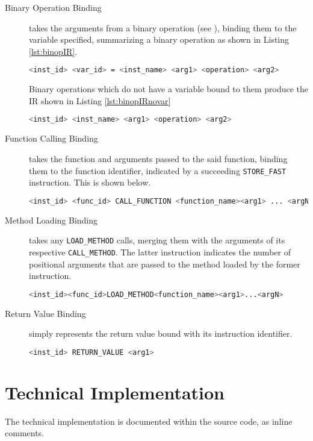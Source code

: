         \begin{description}
            \item[Binary Operation Binding] takes the arguments from a binary operation (see ), binding them to the variable specified, summarizing a binary operation as shown in Listing \ref{lst:binopIR}.
            
            \begin{lstlisting}[language=bash,caption=Binary Operation Binding Syntax w/variable,numbers=none,label=lst:binopIR]
<inst_id> <var_id> = <inst_name> <arg1> <operation> <arg2>
            \end{lstlisting}

            Binary operations which do not have a variable bound to them produce the \acs{IR} shown in Listing \ref{lst:binopIRnovar}

            \begin{lstlisting}[language=bash,caption=Binary Operation Binding Syntax w/no variable,numbers=none,label=lst:binopIRnovar]
<inst_id> <inst_name> <arg1> <operation> <arg2>
            \end{lstlisting}

            \item[Function Calling Binding] takes the function and arguments passed to the said function, binding them to the function identifier, indicated by a succeeding \lstinline|STORE_FAST| instruction. This is shown below.
            \begin{lstlisting}[language=bash, caption=Function Calling Binding,numbers=none]
<inst_id> <func_id> CALL_FUNCTION <function_name><arg1> ... <argN>
            \end{lstlisting}
        
            \item[Method Loading Binding] takes any \lstinline|LOAD_METHOD| calls, merging them with the arguments of its respective \lstinline|CALL_METHOD|. The latter instruction indicates the number of positional arguments that are passed to the method loaded by the former instruction. 
            \begin{lstlisting}[language=bash, caption=Method Loading Binding,numbers=none]
<inst_id><func_id>LOAD_METHOD<function_name><arg1>...<argN>
            \end{lstlisting}
            \item[Return Value Binding] simply represents the return value bound with its instruction identifier.
            \begin{lstlisting}[language=bash, caption=Function Calling Binding,numbers=none]
                <inst_id> RETURN_VALUE <arg1>
            \end{lstlisting}
        \end{description}



    \section{Technical Implementation}
            
           \par The technical implementation is documented within the source code, as inline comments.